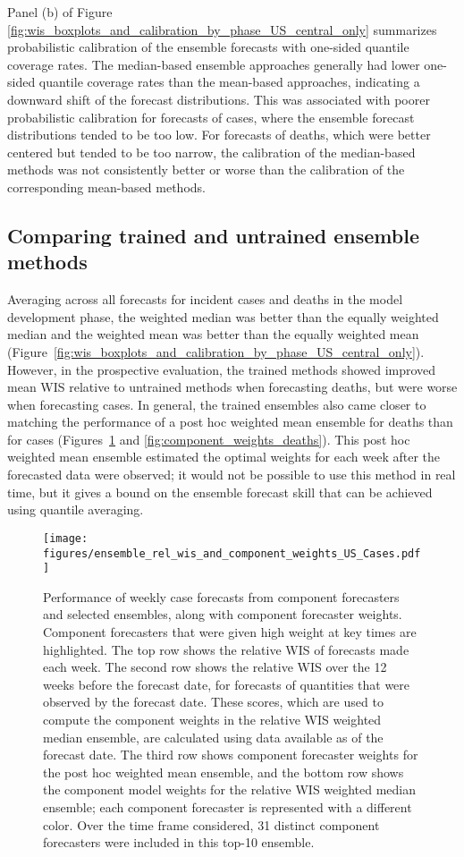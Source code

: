 \documentclass[11pt,3p,authoryear]{elsarticle}
\begin{document}
Panel (b) of Figure \ref{fig:wis_boxplots_and_calibration_by_phase_US_central_only} summarizes probabilistic calibration of the ensemble forecasts with one-sided quantile coverage rates. The median-based ensemble approaches generally had lower one-sided quantile coverage rates than the mean-based approaches, indicating a downward shift of the forecast distributions. This was associated with poorer probabilistic calibration for forecasts of cases, where the ensemble forecast distributions tended to be too low. For forecasts of deaths, which were better centered but tended to be too narrow, the calibration of the median-based methods was not consistently better or worse than the calibration of the corresponding mean-based methods.

\subsection{Comparing trained and untrained ensemble methods}
\label{subsec:results_trained}

Averaging across all forecasts for incident cases and deaths in the model development phase, the weighted median was better than the equally weighted median and the weighted mean was better than the equally weighted mean (Figure~\ref{fig:wis_boxplots_and_calibration_by_phase_US_central_only}).
However, in the prospective evaluation, the trained methods showed improved mean WIS relative to untrained methods when forecasting deaths, but were worse when forecasting cases. In general, the trained ensembles also came closer to matching the performance of a post hoc weighted mean ensemble for deaths than for cases (Figures~\ref{fig:component_weights_cases} and \ref{fig:component_weights_deaths}). This post hoc weighted mean ensemble estimated the optimal weights for each week after the forecasted data were observed; it would not be possible to use this method in real time, but it gives a bound on the ensemble forecast skill that can be achieved using quantile averaging.

\begin{figure}
\texttt{[image: figures/ensemble\_rel\_wis\_and\_component\_weights\_US\_Cases.pdf]}
\caption{Performance of weekly case forecasts from component forecasters and selected ensembles, along with component forecaster weights. Component forecasters that were given high weight at key times are highlighted. The top row shows the relative WIS of forecasts made each week. The second row shows the relative WIS over the 12 weeks before the forecast date, for forecasts of quantities that were observed by the forecast date. These scores, which are used to compute the component weights in the relative WIS weighted median ensemble, are calculated using data available as of the forecast date. The third row shows component forecaster weights for the post hoc weighted mean ensemble, and the bottom row shows the component model weights for the relative WIS weighted median ensemble; each component forecaster is represented with a different color. Over the time frame considered, 31 distinct component forecasters were included in this top-10 ensemble.}
\label{fig:component_weights_cases}
\end{figure}
\end{document}
